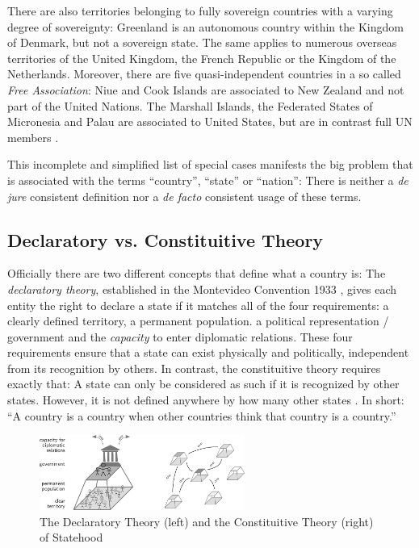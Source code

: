 There are also territories belonging to fully sovereign countries with a varying degree of sovereignty: Greenland is an autonomous country within the Kingdom of Denmark, but not a sovereign state. The same applies to numerous overseas territories of the United Kingdom, the French Republic or the Kingdom of the Netherlands. Moreover, there are five quasi-independent countries in a so called \emph{Free Association}: Niue and Cook Islands are associated to New Zealand and not part of the United Nations. The Marshall Islands, the Federated States of Micronesia and Palau are associated to United States, but are in contrast full UN members \cite{SpecialTerritories}.


This incomplete and simplified list of special cases manifests the big problem that is associated with the terms ``country'', ``state'' or ``nation'': There is neither a \emph{de jure} consistent definition nor a \emph{de facto} consistent usage of these terms.


\subsection{Declaratory vs. Constituitive Theory} %
\label{sub:declaratory_vs_constituitive_theory}

Officially there are two different concepts that define what a country is: The \emph{declaratory theory}, established in the Montevideo Convention 1933 \cite{MontevideoConvention}, gives each entity the right to declare a state if it matches all of the four requirements: a clearly defined territory, a permanent population. a political representation / government and the \emph{capacity} to enter diplomatic relations. These four requirements ensure that a state can exist physically and politically, independent from its recognition by others.
In contrast, the constituitive theory requires exactly that: A state can only be considered as such if it is recognized by other states. However, it is not defined anywhere by how many other states \cite{StateTheory}. In short: ``A country is a country when other countries think that country is a country.'' \cite{greyCountries}

\begin{figure}[ht]
  \centering
  \includegraphics[width = 0.6\textwidth]{graphics/basics/countries/decl_const_theory}
  \caption{The Declaratory Theory (left) and the Constituitive Theory (right) of Statehood}
  \label{fig:declaratory_constituitive_theory}
\end{figure}

